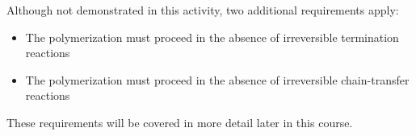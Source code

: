 \begin{activity}
\begin{exercises}
\begin{solution}
{				Although not demonstrated in this activity, two additional requirements apply:
				\begin{itemize}
					\item The polymerization must proceed in the absence of irreversible termination reactions
					\item The polymerization must proceed in the absence of irreversible chain-transfer reactions
				\end{itemize}
				These requirements will be covered in more detail later in this course.
			}\end{solution}
			
\end{exercises}
	
\end{activity}